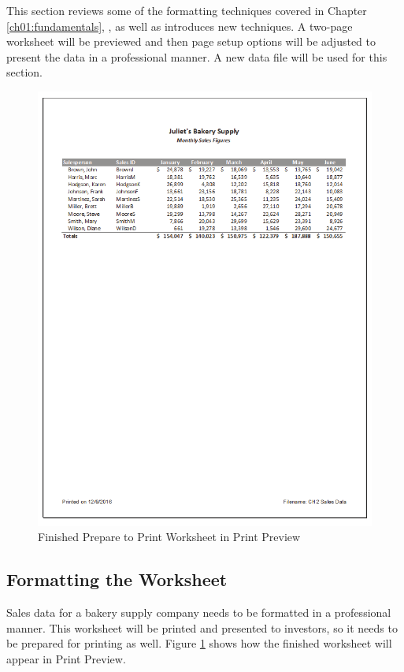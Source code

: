 This section reviews some of the formatting techniques covered in Chapter \ref{ch01:fundamentals}, , as well as introduces new techniques. A two-page worksheet will be previewed and then page setup options will be adjusted to present the data in a professional manner. A new data file will be used for this section.

\begin{figure}[H]
	\centering
	\includegraphics[width=\maxwidth{.95\linewidth}]{gfx/ch02_fig40}
	\caption{Finished Prepare to Print Worksheet in Print Preview}
	\label{02:fig40}
\end{figure}

\subsection{Formatting the Worksheet}

Sales data for a bakery supply company needs to be formatted in a professional manner. This worksheet will be printed and presented to investors, so it needs to be prepared for printing as well. Figure \ref{02:fig40} shows how the finished worksheet will appear in Print Preview.


